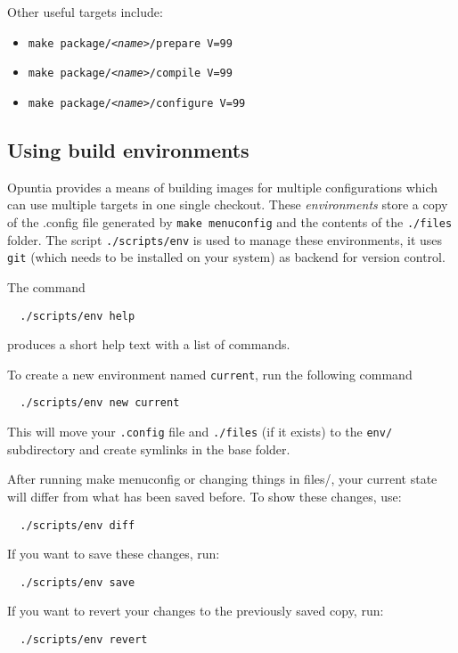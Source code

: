 Other useful targets include:

\begin{itemize}
    \item \texttt{make package/\textit{<name>}/prepare V=99}
    \item \texttt{make package/\textit{<name>}/compile V=99}
    \item \texttt{make package/\textit{<name>}/configure V=99}
\end{itemize}


\subsection{Using build environments}
Opuntia provides a means of building images for multiple configurations
which can use multiple targets in one single checkout. These \emph{environments}
store a copy of the .config file generated by \texttt{make menuconfig} and the contents
of the \texttt{./files} folder.
The script \texttt{./scripts/env} is used to manage these environments, it uses
\texttt{git} (which needs to be installed on your system) as backend for version control.

The command 
\begin{Verbatim}
  ./scripts/env help
\end{Verbatim}
produces a short help text with a list of commands.

To create a new environment named \texttt{current}, run the following command
\begin{Verbatim}
  ./scripts/env new current
\end{Verbatim}
This will move your \texttt{.config} file and \texttt{./files} (if it exists) to
the \texttt{env/} subdirectory and create symlinks in the base folder.

After running make menuconfig or changing things in files/, your current state will
differ from what has been saved before. To show these changes, use:
\begin{Verbatim}
  ./scripts/env diff
\end{Verbatim}

If you want to save these changes, run:
\begin{Verbatim}
  ./scripts/env save
\end{Verbatim}
If you want to revert your changes to the previously saved copy, run:
\begin{Verbatim}
  ./scripts/env revert
\end{Verbatim}

